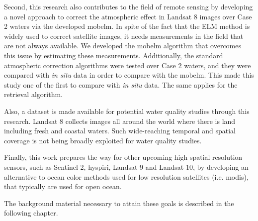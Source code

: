 Second, this research also contributes to the field of remote sensing by developing a novel approach to correct the atmospheric effect in Landsat 8 images over Case 2 waters via the developed \gls{mobelm}. In spite of the fact that the ELM method is widely used to correct satellite images, it needs measurements in the field that are not always available. We developed the \gls{mobelm} algorithm that overcomes this issue by estimating these measurements. Additionally, the standard atmospheric correction algorithms were tested over Case 2 waters, and they were compared with {\it in situ} data in order to compare with the \gls{mobelm}. This made this study one of the first to compare with {\it in situ} data. The same applies for the retrieval algorithm.

Also, a dataset is made available for potential water quality studies through this research. Landsat 8 collects images all around the world where there is land including fresh and coastal waters. Such wide-reaching temporal and spatial coverage is not being broadly exploited for water quality studies.

Finally, this work prepares the way for other upcoming high spatial resolution sensors, such as Sentinel 2, \gls{hyspiri}, Landsat 9 and Landsat 10, by developing an alternative to ocean color methods used for low resolution satellites (i.e. \gls{modis}), that typically are used for open ocean.


The background material necessary to attain these goals is described in the following chapter.
